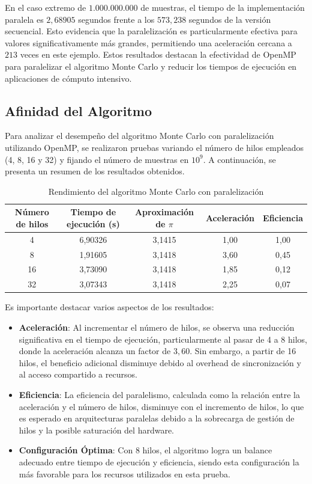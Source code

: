 \documentclass[a4paper, 10pt, onecolumn]{IEEEtran}
\begin{document}
En el caso extremo de $1.000.000.000$ de muestras, el tiempo de la implementación paralela es $2,68905$ segundos frente a los $573,238$ segundos de la versión secuencial. Esto evidencia que la paralelización es particularmente efectiva para valores significativamente más grandes, permitiendo una aceleración cercana a $213$ veces en este ejemplo. Estos resultados destacan la efectividad de OpenMP para paralelizar el algoritmo Monte Carlo y reducir los tiempos de ejecución en aplicaciones de cómputo intensivo.

\subsection{Afinidad del Algoritmo}

Para analizar el desempeño del algoritmo Monte Carlo con paralelización utilizando OpenMP, se realizaron pruebas variando el número de hilos empleados (4, 8, 16 y 32) y fijando el número de muestras en $10^9$. A continuación, se presenta un resumen de los resultados obtenidos.

\begin{table}[H]
  \centering
  \begin{tabular}{|c|c|c|c|c|}
    \hline
    \textbf{Número de hilos} & \textbf{Tiempo de ejecución (s)} & \textbf{Aproximación de $\pi$} & \textbf{Aceleración} & \textbf{Eficiencia} \\
    \hline
    4  & 6,90326  & 3,1415 & 1,00  & 1,00 \\
    8  & 1,91605  & 3,1418 & 3,60  & 0,45 \\
    16 & 3,73090  & 3,1418 & 1,85  & 0,12 \\
    32 & 3,07343  & 3,1418 & 2,25  & 0,07 \\
    \hline
  \end{tabular}
  \caption{Rendimiento del algoritmo Monte Carlo con paralelización}
  \label{tab:parallel_affinity}
\end{table}

Es importante destacar varios aspectos de los resultados:

\begin{itemize}
  \item \textbf{Aceleración}: Al incrementar el número de hilos, se observa una reducción significativa en el tiempo de ejecución, particularmente al pasar de 4 a 8 hilos, donde la aceleración alcanza un factor de $3,60$. Sin embargo, a partir de 16 hilos, el beneficio adicional disminuye debido al overhead de sincronización y al acceso compartido a recursos.
  
  \item \textbf{Eficiencia}: La eficiencia del paralelismo, calculada como la relación entre la aceleración y el número de hilos, disminuye con el incremento de hilos, lo que es esperado en arquitecturas paralelas debido a la sobrecarga de gestión de hilos y la posible saturación del hardware.
  
  \item \textbf{Configuración Óptima}: Con 8 hilos, el algoritmo logra un balance adecuado entre tiempo de ejecución y eficiencia, siendo esta configuración la más favorable para los recursos utilizados en esta prueba.
\end{itemize}
\end{document}

